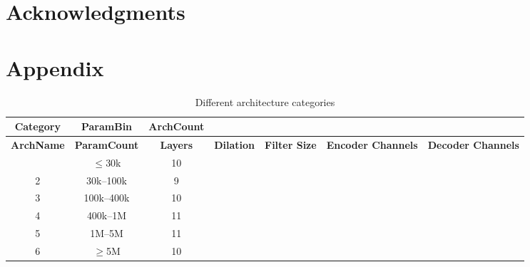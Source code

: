 \documentclass[preprint,12pt]{elsarticle}
\begin{document}
\section*{Acknowledgments}
\noindent



\section{Appendix}\label{sec:appendix}
\begin{footnotesize}
\setlength{\tabcolsep}{6pt}
\begin{longtable}{ccc}
\caption{Different architecture categories}
\label{tab:tcn-arch-paramgrid}\\
\toprule
\textbf{Category} & \textbf{ParamBin} & \textbf{ArchCount} \\
\midrule
\endfirsthead

\toprule
\textbf{ArchName} & \textbf{ParamCount} & \textbf{Layers} & \textbf{Dilation} & \textbf{Filter Size} & \textbf{Encoder Channels} & \textbf{Decoder Channels} \\
\midrule
\endhead

\endfoot

\bottomrule
{} & $\le$30k     & 10 \\
2 & 30k--100k    & 9  \\
3 & 100k--400k   & 10 \\
4 & 400k--1M     & 11 \\
5 & 1M--5M       & 11 \\
6 & $\ge$5M      & 10 \\

\end{longtable}
\end{footnotesize}


  
 
\end{document}
